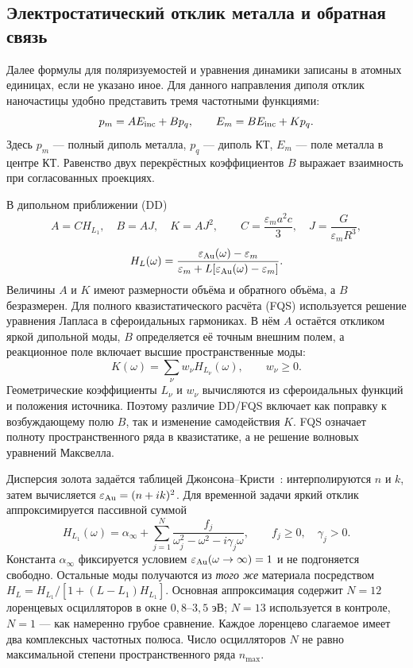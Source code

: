 \subsection{Электростатический отклик металла и обратная связь}
Далее формулы для поляризуемостей и уравнения динамики записаны в атомных
единицах, если не указано иное. Для данного направления диполя отклик
наночастицы удобно представить тремя частотными функциями:
\begin{equation}
p_m=A E_{\rm inc}+B p_q,\qquad
E_m=B E_{\rm inc}+K p_q.\label{eq:ABK}
\end{equation}
Здесь $p_m$ --- полный диполь металла, $p_q$ --- диполь КТ,
$E_m$ --- поле металла в центре КТ. Равенство двух перекрёстных
коэффициентов $B$ выражает взаимность при согласованных проекциях.

В дипольном приближении (DD)
\begin{equation}
A=C H_{L_1},\quad B=AJ,\quad K=AJ^2,\qquad
C=\frac{\varepsilon_m a^2c}{3},\quad
J=\frac{G}{\varepsilon_m R^3},\label{eq:DD}
\end{equation}
\begin{equation}
H_L(\omega)=\frac{\varepsilon_{\rm Au}(\omega)-\varepsilon_m}
{\varepsilon_m+L[\varepsilon_{\rm Au}(\omega)-\varepsilon_m]}.
\label{eq:HL}
\end{equation}
Величины $A$ и $K$ имеют размерности объёма и обратного объёма,
а $B$ безразмерен. Для полного квазистатического расчёта (FQS)
используется решение уравнения Лапласа в сфероидальных гармониках.
В нём $A$ остаётся откликом яркой дипольной моды, $B$ определяется её
точным внешним полем, а реакционное поле включает высшие пространственные
моды:
\begin{equation}
K(\omega)=\sum_\nu w_\nu H_{L_\nu}(\omega),\qquad w_\nu\geq0.
\label{eq:kernel}
\end{equation}
Геометрические коэффициенты $L_\nu$ и $w_\nu$ вычисляются из
сфероидальных функций и положения источника. Поэтому различие DD/FQS
включает как поправку к возбуждающему полю $B$, так и изменение
самодействия $K$. FQS означает полноту пространственного ряда в
квазистатике, а не решение волновых уравнений Максвелла.

Дисперсия золота задаётся таблицей Джонсона--Кристи~\cite{johnson1972}:
интерполируются $n$ и $k$, затем вычисляется
$\varepsilon_{\rm Au}=(n+ik)^2$.
Для временной задачи яркий отклик аппроксимируется пассивной суммой
\begin{equation}
H_{L_1}(\omega)=\alpha_\infty+
\sum_{j=1}^{N}\frac{f_j}{\omega_j^2-\omega^2-i\gamma_j\omega},
\qquad f_j\geq0,\quad\gamma_j>0.\label{eq:lorentz}
\end{equation}
Константа $\alpha_\infty$ фиксируется условием
$\varepsilon_{\rm Au}(\omega\to\infty)=1$ и не подгоняется свободно.
Остальные моды получаются из \emph{того же} материала посредством
$H_L=H_{L_1}/[1+(L-L_1)H_{L_1}]$. Основная аппроксимация содержит
$N=12$ лоренцевых осцилляторов в окне $0{,}8$--$3{,}5$ эВ;
$N=13$ используется в контроле, $N=1$ --- как намеренно грубое сравнение.
Каждое лоренцево слагаемое имеет два комплексных частотных полюса.
Число осцилляторов $N$ не равно максимальной степени пространственного ряда $n_{\max}$.

